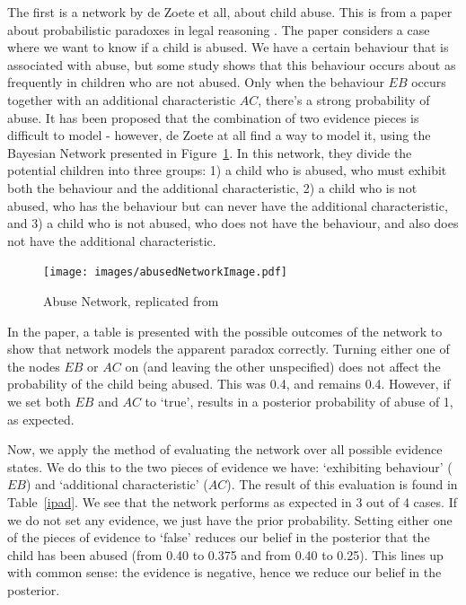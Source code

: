 \documentclass[12pt]{article}
\begin{document}
The first is a network by de Zoete et all, about child abuse. This is from a paper about probabilistic paradoxes in legal reasoning \citep{deZoete2019}. The paper considers a case where we want to know if a child is abused. We have a certain behaviour that is associated with abuse, but some study shows that this behaviour occurs about as frequently in children who are not abused. Only when the behaviour $EB$ occurs together with an additional characteristic $AC$, there's a strong probability of abuse. It has been proposed that the combination of two evidence pieces is difficult to model - however, de Zoete at all find a way to model it, using the Bayesian Network presented in Figure~\ref{pity}. In this network, they divide the potential children into three groups: 1) a child who is abused, who must exhibit both the behaviour and the additional characteristic, 2) a child who is not abused, who has the behaviour but can never have the additional characteristic, and 3) a child who is not abused, who does not have the behaviour, and also does not have the additional characteristic.
 

 \begin{figure}[htbp]
\begin{center}
\texttt{[image: images/abusedNetworkImage.pdf]}
\caption{Abuse Network, replicated from \citep{deZoete2019}}
\label{pity}
\end{center}
\end{figure}

In the paper, a table is presented with the possible outcomes of the network to show that network models the apparent paradox correctly. Turning either one of the nodes $EB$ or $AC$ on (and leaving the other unspecified) does not affect the probability of the child being abused. This was 0.4, and remains 0.4. However, if we set both $EB$ and $AC$ to `true', results in a posterior probability of abuse of 1, as expected.

Now, we apply the method of evaluating the network over all possible evidence states. We do this to the two pieces of evidence we have: `exhibiting behaviour' ($EB$) and `additional characteristic' ($AC$). The result of this evaluation is found in Table~\ref{ipad}. We see that the network performs as expected in 3 out of 4 cases. If we do not set any evidence, we just have the prior probability. Setting either one of the pieces of evidence to `false' reduces our belief in the posterior that the child has been abused (from 0.40 to 0.375 and from 0.40 to 0.25). This lines up with common sense: the evidence is negative, hence we reduce our belief in the posterior.
\end{document}
